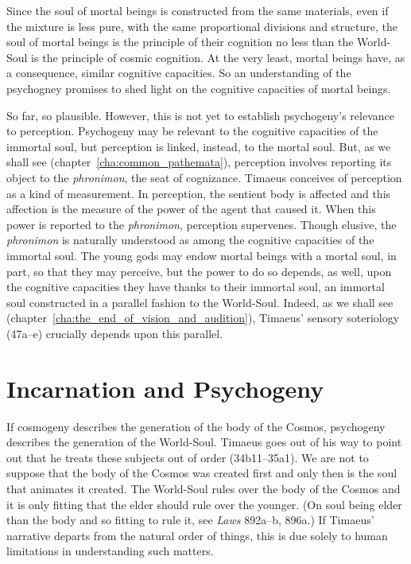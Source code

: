 Since the soul of mortal beings is constructed from the same materials, even if the mixture is less pure, with the same proportional divisions and structure, the soul of mortal beings is the principle of their cognition no less than the World-Soul is the principle of cosmic cognition. At the very least, mortal beings have, as a consequence, similar cognitive capacities. So an understanding of the psychogney promises to shed light on the cognitive capacities of mortal beings.

So far, so plausible. However, this is not yet to establish psychogeny's relevance to perception. Psychogeny may be relevant to the cognitive capacities of the immortal soul, but perception is linked, instead, to the mortal soul. But, as we shall see (chapter~\ref{cha:common_pathemata}), perception involves reporting its object to the \emph{phronimon}, the seat of cognizance. Timaeus conceives of perception as a kind of measurement. In perception, the sentient body is affected and this affection is the measure of the power of the agent that caused it. When this power is reported to the \emph{phronimon}, perception supervenes. Though elusive, the \emph{phronimon} is naturally understood as among the cognitive capacities of the immortal soul. The young gods may endow mortal beings with a mortal soul, in part, so that they may perceive, but the power to do so depends, as well, upon the cognitive capacities they have thanks to their immortal soul, an immortal soul constructed in a parallel fashion to the World-Soul. Indeed, as we shall see (chapter~\ref{cha:the_end_of_vision_and_audition}), Timaeus' sensory soteriology (47a--e) crucially depends upon this parallel.



\section{Incarnation and Psychogeny} %
\label{sec:embodiment_and_psychogeny}

If cosmogeny describes the generation of the body of the Cosmos, psychogeny describes the generation of the World-Soul. Timaeus goes out of his way to point out that he treats these subjects out of order (34b11--35a1). We are not to suppose that the body of the Cosmos was created first and only then is the soul that animates it created. The World-Soul rules over the body of the Cosmos and it is only fitting that the elder should rule over the younger. (On soul being elder than the body and so fitting to rule it, see \emph{Laws} 892a--b, 896a.) If Timaeus' narrative departs from the natural order of things, this is due solely to human limitations in understanding such matters.

